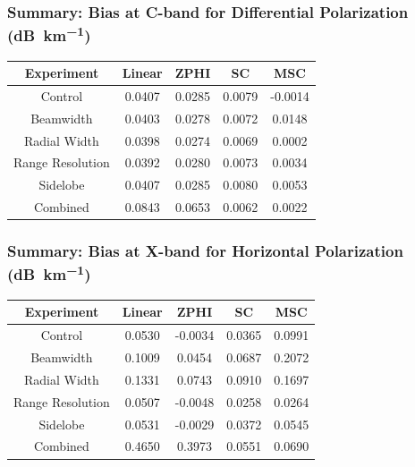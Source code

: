 \documentclass[red]{beamer}
\begin{document}
\begin{frame}
    \frametitle{Summary: Bias at C-band for Differential Polarization (\si{dB\per \kilo\meter})}
    \begin{center}
        \begin{tabular}{| c | c | c | c | c |}
            \hline
            Experiment & Linear & ZPHI & SC & MSC \\
            \hline
            \hline
            Control & 0.0407 & 0.0285 & 0.0079 & -0.0014 \\
            Beamwidth & 0.0403 & 0.0278 & 0.0072 & 0.0148 \\
            Radial Width & 0.0398 & 0.0274 & 0.0069 & 0.0002 \\
            Range Resolution & 0.0392 & 0.0280 & 0.0073 & 0.0034 \\
            Sidelobe & 0.0407 & 0.0285 & 0.0080 & 0.0053 \\
            Combined & 0.0843 & 0.0653 & 0.0062 & 0.0022 \\
            \hline
        \end{tabular}
    \end{center}
\end{frame}

\begin{frame}
    \frametitle{Summary: Bias at X-band for Horizontal Polarization (\si{dB\per \kilo\meter})}
    \begin{center}
        \begin{tabular}{| c | c | c | c | c |}
            \hline
            Experiment & Linear & ZPHI & SC & MSC \\
            \hline
            \hline
            Control & 0.0530 & -0.0034 & 0.0365 & 0.0991 \\
            Beamwidth & 0.1009 & 0.0454 & 0.0687 & 0.2072 \\
            Radial Width & 0.1331 & 0.0743 & 0.0910 & 0.1697 \\
            Range Resolution & 0.0507 & -0.0048 & 0.0258 & 0.0264 \\
            Sidelobe & 0.0531 & -0.0029 & 0.0372 & 0.0545 \\
            Combined & 0.4650 & 0.3973 & 0.0551 & 0.0690 \\
            \hline
        \end{tabular}
    \end{center}
\end{frame}
\end{document}

